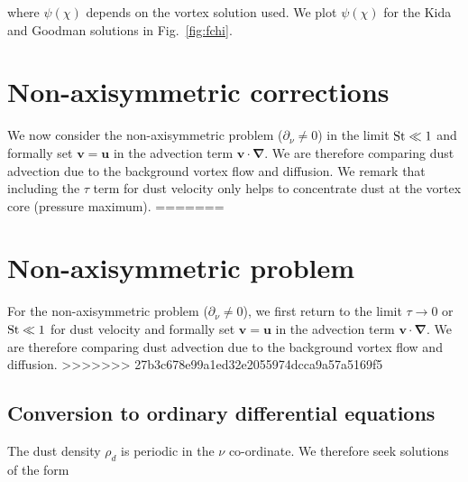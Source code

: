 \documentclass[apj]{emulateapj}
\renewcommand{\v}[1]{{\boldsymbol{#1}}} %
\newcommand{\del}{\v{\nabla}}
\newcommand{\Fig}[1]{Fig.~\ref{#1}}
\newcommand{\fig}[1]{\Fig{#1}}
\begin{document}
\noindent where $\psi(\chi)$ depends on the vortex solution used. We plot 
$\psi(\chi)$ for the Kida and Goodman solutions in \fig{fig:fchi}.

\section{Non-axisymmetric corrections}
We now consider the non-axisymmetric problem ($\partial_\nu\neq0$) 
in the limit $\rm{St}\ll 1$ and formally set $\bm{v}=\bm{u}$ 
in the advection term $\bm{v}\cdot\del$. We are therefore comparing  
dust advection due to the background vortex flow and diffusion. We remark that including the   
$\tau$ term for dust velocity only helps to concentrate dust at the vortex core (pressure maximum).   
=======
\section{Non-axisymmetric problem}
For the non-axisymmetric problem ($\partial_\nu\neq0$), we first
return to the limit $\tau\to0$ or $\rm{St}\ll 1$ for dust velocity and
formally set $\bm{v}=\bm{u}$ in the advection term 
$\bm{v}\cdot\del$. We are therefore comparing dust advection due to
the background vortex flow and diffusion. 
>>>>>>> 27b3c678e99a1ed32e2055974dcca9a57a5169f5

\subsection{Conversion to ordinary differential equations}
The dust density $\rho_d$ is periodic in the $\nu$ co-ordinate. We
therefore seek solutions of the form
\end{document}
